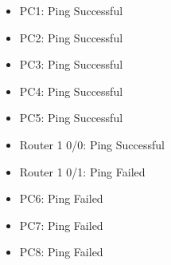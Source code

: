 \documentclass[a4paper,11pt]{article}
\begin{document}
\begin{enumerate}
\begin{itemize}
                  \item PC1: Ping Successful
                  \item PC2: Ping Successful
                  \item PC3: Ping Successful
                  \item PC4: Ping Successful
                  \item PC5: Ping Successful
                  \item Router 1 0/0: Ping Successful
                  \item Router 1 0/1: Ping Failed
                  \item PC6: Ping Failed
                  \item PC7: Ping Failed
                  \item PC8: Ping Failed
            \end{itemize}


\end{enumerate}
\end{document}
